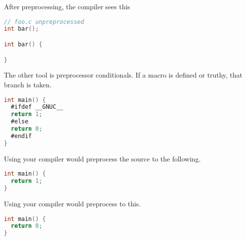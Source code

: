 After preprocessing, the compiler sees this

\begin{lstlisting}[language=C]
// foo.c unpreprocessed
int bar();

int bar() {

}
\end{lstlisting}

The other tool is \gls{preprocessor conditionals}.
If a macro is defined or truthy, that branch is taken.

\begin{lstlisting}[language=C]
int main() {
  #ifdef __GNUC__
  return 1;
  #else
  return 0;
  #endif
}
\end{lstlisting}

Using  your compiler would preprocess the source to the following.

\begin{lstlisting}[language=C]
int main() {
  return 1;
}
\end{lstlisting}

Using  your compiler would preprocess to this.

\begin{lstlisting}[language=C]
int main() {
  return 0;
}
\end{lstlisting}


